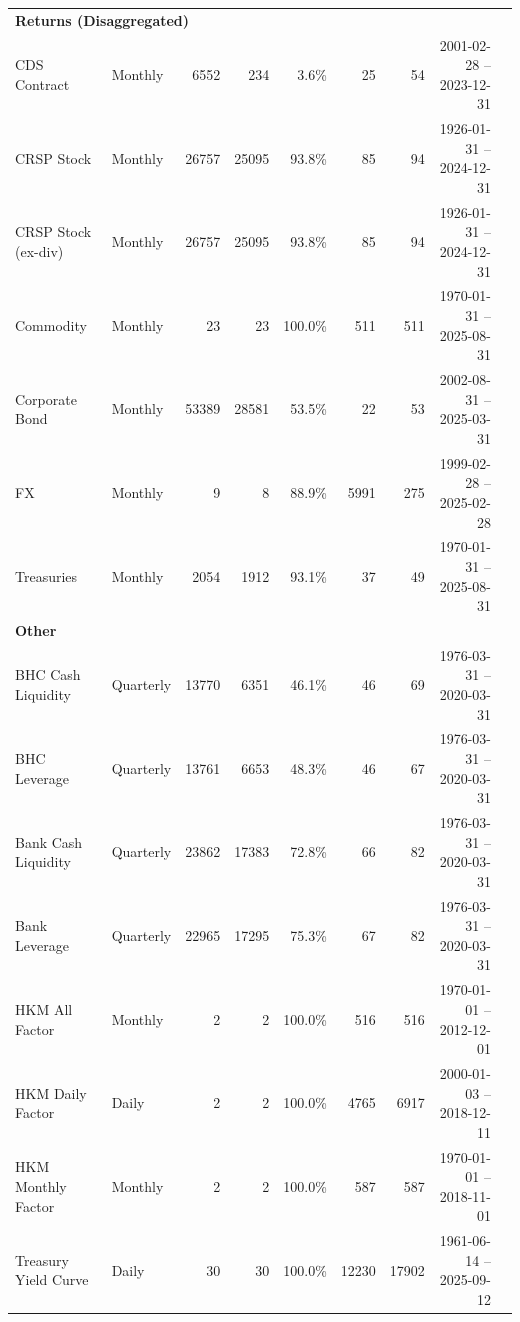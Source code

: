 \begin{tabular}{@{}llrrrrrrl@{}}
\midrule
\multicolumn{8}{l}{\textbf{Returns (Disaggregated)}} \\
CDS Contract & Monthly & 6552 & 234 & 3.6\% & 25 & 54 & 2001-02-28 -- 2023-12-31 \\
CRSP Stock & Monthly & 26757 & 25095 & 93.8\% & 85 & 94 & 1926-01-31 -- 2024-12-31 \\
CRSP Stock (ex-div) & Monthly & 26757 & 25095 & 93.8\% & 85 & 94 & 1926-01-31 -- 2024-12-31 \\
Commodity & Monthly & 23 & 23 & 100.0\% & 511 & 511 & 1970-01-31 -- 2025-08-31 \\
Corporate Bond & Monthly & 53389 & 28581 & 53.5\% & 22 & 53 & 2002-08-31 -- 2025-03-31 \\
FX & Monthly & 9 & 8 & 88.9\% & 5991 & 275 & 1999-02-28 -- 2025-02-28 \\
Treasuries & Monthly & 2054 & 1912 & 93.1\% & 37 & 49 & 1970-01-31 -- 2025-08-31 \\
\midrule
\multicolumn{8}{l}{\textbf{Other}} \\
BHC Cash Liquidity & Quarterly & 13770 & 6351 & 46.1\% & 46 & 69 & 1976-03-31 -- 2020-03-31 \\
BHC Leverage & Quarterly & 13761 & 6653 & 48.3\% & 46 & 67 & 1976-03-31 -- 2020-03-31 \\
Bank Cash Liquidity & Quarterly & 23862 & 17383 & 72.8\% & 66 & 82 & 1976-03-31 -- 2020-03-31 \\
Bank Leverage & Quarterly & 22965 & 17295 & 75.3\% & 67 & 82 & 1976-03-31 -- 2020-03-31 \\
HKM All Factor & Monthly & 2 & 2 & 100.0\% & 516 & 516 & 1970-01-01 -- 2012-12-01 \\
HKM Daily Factor & Daily & 2 & 2 & 100.0\% & 4765 & 6917 & 2000-01-03 -- 2018-12-11 \\
HKM Monthly Factor & Monthly & 2 & 2 & 100.0\% & 587 & 587 & 1970-01-01 -- 2018-11-01 \\
Treasury Yield Curve & Daily & 30 & 30 & 100.0\% & 12230 & 17902 & 1961-06-14 -- 2025-09-12 \\
\bottomrule
\end{tabular}